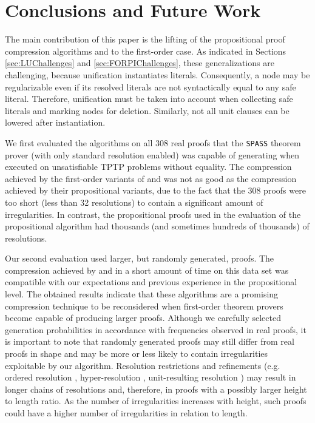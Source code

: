 \section{Conclusions and Future Work}\label{sec:conclusion}

The main contribution of this paper is the lifting of the propositional proof compression algorithms {\LowerUnits} and {\RPI} to the first-order case. 
As indicated in Sections \ref{sec:LUChallenges} and \ref{sec:FORPIChallenges}, these generalizations are challenging, because unification instantiates literals. 
Consequently, a node may be regularizable even if its resolved literals are not syntactically equal to any safe literal. 
Therefore, unification must be taken into account when collecting safe literals and marking nodes for deletion.
Similarly, not all unit clauses can be lowered after instantiation.

We first evaluated the algorithms on all 308 real proofs that the \texttt{SPASS} theorem prover (with only standard resolution enabled) was capable of generating when executed on unsatisfiable TPTP problems without equality. 
The compression achieved by the first-order variants of {\LowerUnits} and {\FORPI} was not as good as the compression achieved by their propositional variants, due to the fact that the 308 proofs were too short (less than 32 resolutions) to contain a significant amount of irregularities. 
In contrast, the propositional proofs used in the evaluation of the propositional {\RPI} algorithm had thousands (and sometimes hundreds of thousands) of resolutions. 

Our second evaluation used larger, but randomly generated, proofs. 
The compression achieved by {\GFOLU} and {\FORPI} in a short amount of time on this data set was compatible with our expectations and previous experience in the propositional level. 
The obtained results indicate that these algorithms are a promising compression technique to be reconsidered when first-order theorem provers become capable of producing larger proofs. 
Although we carefully selected generation probabilities in accordance with frequencies observed in real proofs, it is important to note that randomly generated proofs may still differ from real proofs in shape and may be more or less likely to contain irregularities exploitable by our algorithm. Resolution restrictions and refinements (e.g. ordered resolution %
\cite{hsiang1991proving,OrderedRes}, hyper-resolution \cite{HyperResolution,robinson1965automatic}, unit-resulting resolution \cite{UnitResultingResolution,prover9-mace4}) may result in longer chains of resolutions and, therefore, in proofs with a possibly larger height to length ratio. 
As the number of irregularities increases with height, such proofs could have a higher number of irregularities in relation to length.

